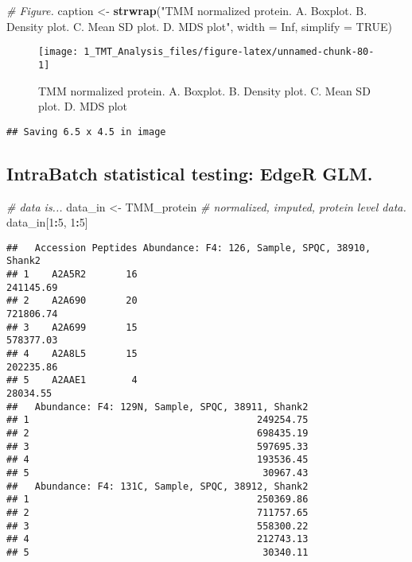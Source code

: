 \documentclass[]{article}
\newenvironment{Shaded}{\begin{snugshade}}{\end{snugshade}}
\newcommand{\KeywordTok}[1]{\textcolor[rgb]{0.13,0.29,0.53}{\textbf{#1}}}
\newcommand{\DataTypeTok}[1]{\textcolor[rgb]{0.13,0.29,0.53}{#1}}
\newcommand{\DecValTok}[1]{\textcolor[rgb]{0.00,0.00,0.81}{#1}}
\newcommand{\StringTok}[1]{\textcolor[rgb]{0.31,0.60,0.02}{#1}}
\newcommand{\CommentTok}[1]{\textcolor[rgb]{0.56,0.35,0.01}{\textit{#1}}}
\newcommand{\OtherTok}[1]{\textcolor[rgb]{0.56,0.35,0.01}{#1}}
\newcommand{\OperatorTok}[1]{\textcolor[rgb]{0.81,0.36,0.00}{\textbf{#1}}}
\newcommand{\NormalTok}[1]{#1}
\begin{document}
\begin{Shaded}
\begin{Highlighting}[]
\CommentTok{# Figure.}
\NormalTok{caption <-}\StringTok{ }\KeywordTok{strwrap}\NormalTok{(}\StringTok{"TMM normalized protein. A. Boxplot. B. Density plot.}
\StringTok{                   C. Mean SD plot. D. MDS plot"}\NormalTok{, }\DataTypeTok{width =} \OtherTok{Inf}\NormalTok{, }\DataTypeTok{simplify =} \OtherTok{TRUE}\NormalTok{)}
\end{Highlighting}
\end{Shaded}

\begin{figure}

{\centering \texttt{[image: 1\_TMT\_Analysis\_files/figure-latex/unnamed-chunk-80-1]} 

}

\caption{TMM normalized protein. A. Boxplot. B. Density plot.  C. Mean SD plot. D. MDS plot}\label{fig:unnamed-chunk-80}
\end{figure}

\begin{verbatim}
## Saving 6.5 x 4.5 in image
\end{verbatim}

\subsection{IntraBatch statistical testing: EdgeR
GLM.}\label{intrabatch-statistical-testing-edger-glm.}

\begin{Shaded}
\begin{Highlighting}[]
\CommentTok{# data is...}
\NormalTok{data_in <-}\StringTok{ }\NormalTok{TMM_protein }\CommentTok{# normalized, imputed, protein level data.}
\NormalTok{data_in[}\DecValTok{1}\OperatorTok{:}\DecValTok{5}\NormalTok{, }\DecValTok{1}\OperatorTok{:}\DecValTok{5}\NormalTok{]}
\end{Highlighting}
\end{Shaded}

\begin{verbatim}
##   Accession Peptides Abundance: F4: 126, Sample, SPQC, 38910, Shank2
## 1    A2A5R2       16                                       241145.69
## 2    A2A690       20                                       721806.74
## 3    A2A699       15                                       578377.03
## 4    A2A8L5       15                                       202235.86
## 5    A2AAE1        4                                        28034.55
##   Abundance: F4: 129N, Sample, SPQC, 38911, Shank2
## 1                                        249254.75
## 2                                        698435.19
## 3                                        597695.33
## 4                                        193536.45
## 5                                         30967.43
##   Abundance: F4: 131C, Sample, SPQC, 38912, Shank2
## 1                                        250369.86
## 2                                        711757.65
## 3                                        558300.22
## 4                                        212743.13
## 5                                         30340.11
\end{verbatim}
\end{document}
